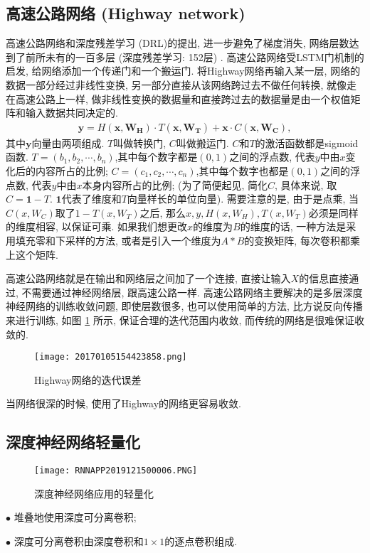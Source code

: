 \subsection{高速公路网络 (Highway network)}
高速公路网络和深度残差学习 (DRL)的提出, 进一步避免了梯度消失, 网络层数达到了前所未有的一百多层 (深度残差学习: 152层) \cite{HeCVPR2016-9590, NIPS2015-5850}.
高速公路网络受LSTM门机制的启发, 给网络添加一个传递门和一个搬运门.
将Highway网络再输入某一层, 网络的数据一部分经过非线性变换, 另一部分直接从该网络跨过去不做任何转换, 就像走在高速公路上一样,
做非线性变换的数据量和直接跨过去的数据量是由一个权值矩阵和输入数据共同决定的.
\begin{align}
    \mathbf{y}=H\left (\mathbf{x}, \mathbf{W}_{\mathbf{H}}\right) \cdot T\left (\mathbf{x}, \mathbf{W}_{\mathbf{T}}\right)+\mathbf{x} \cdot C\left (\mathbf{x}, \mathbf{W}_{\mathbf{C}}\right),
\end{align}
其中$\bm y$向量由两项组成. $T$叫做转换门, $C$叫做搬运门. $C$和$T$的激活函数都是sigmoid函数.
$T= (b_1, b_2, \cdots, b_n)$,其中每个数字都是$(0, 1)$之间的浮点数, 代表$y$中由$x$变化后的内容所占的比例;
$C= (c_1, c_2, \cdots, c_n)$,其中每个数字也都是$(0, 1)$之间的浮点数, 代表$y$中由$x$本身内容所占的比例;
(为了简便起见, 简化$C$, 具体来说, 取$C=\bm 1-T$. $\bm 1$代表了维度和$T$向量样长的单位向量).
需要注意的是, 由于是点乘, 当$C (x,W_C)$取了$1-T (x,W_T)$之后, 那么$x, y, H(x,W_H), T(x,W_T)$必须是同样的维度相容, 以保证可乘.
如果我们想更改$x$的维度为$B$的维度的话, 一种方法是采用填充零和下采样的方法, 或者是引入一个维度为$A*B$的变换矩阵, 每次卷积都乘上这个矩阵.

高速公路网络就是在输出和网络层之间加了一个连接, 直接让输入$X$的信息直接通过, 不需要通过神经网络层, 跟高速公路一样.
高速公路网络主要解决的是多层深度神经网络的训练收敛问题, 即使层数很多, 也可以使用简单的方法, 比方说反向传播来进行训练,
如图 \ref{20170105154423858} 所示, 保证合理的迭代范围内收敛, 而传统的网络是很难保证收敛的.
\begin{figure}[H]
    \centering
    \texttt{[image: 20170105154423858.png]}
    \caption{Highway网络的迭代误差}
    \label{20170105154423858}
    \vspace{-0.4cm}
\end{figure}
当网络很深的时候, 使用了Highway的网络更容易收敛.
\subsection{深度神经网络轻量化}
\begin{figure}[H]
\centering
\texttt{[image: RNNAPP2019121500006.PNG]}
\caption{深度神经网络应用的轻量化}
\label{RNNAPP2019121500006}\vspace{-0.4cm}
\end{figure}
\begin{tcolorbox}[title=MobileNet 网络模型结构改进]
$\bullet$ 堆叠地使用深度可分离卷积;

$\bullet$ 深度可分离卷积由深度卷积和$1\times 1$的逐点卷积组成.
\end{tcolorbox}
